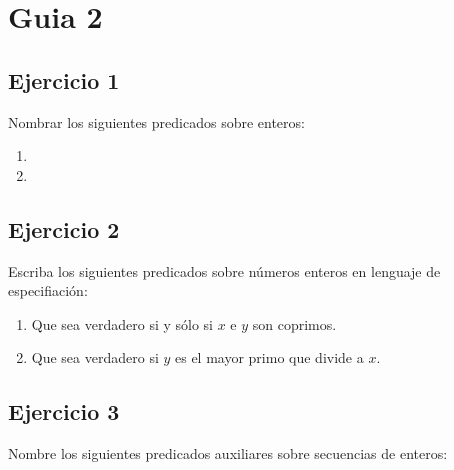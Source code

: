 





\maketitle
\newpage

\tableofcontents
\newpage

\section{Guia 2}

\subsection{Ejercicio 1}
Nombrar los siguientes predicados sobre enteros:

\begin{enumerate}[label=\alph*)]
      \item {}
      \item {}
\end{enumerate}

\subsection{Ejercicio 2}
Escriba los siguientes predicados sobre números enteros en lenguaje de especifiación:

\begin{enumerate}[label=\alph*)]
      \item Que sea verdadero si y sólo si $x$ e $y$ son coprimos.


      \item Que sea verdadero si $y$ es el mayor primo que divide a $x$.

\end{enumerate}

\subsection{Ejercicio 3}
Nombre los siguientes predicados auxiliares sobre secuencias de enteros:

